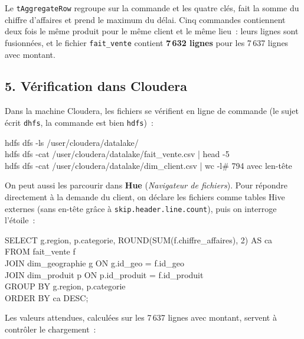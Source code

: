\noindent Le \texttt{tAggregateRow} regroupe sur la commande et les quatre clés, fait la somme du chiffre d'affaires et prend le maximum du délai. Cinq commandes contiennent deux fois le même produit pour le même client et le même lieu~: leurs lignes sont fusionnées, et le fichier \texttt{fait\_vente} contient \textbf{7\,632 lignes} pour les 7\,637 lignes avec montant.

\subsection*{5. Vérification dans Cloudera}
{}

\noindent Dans la machine Cloudera, les fichiers se vérifient en ligne de commande (le sujet écrit \texttt{dhfs}, la commande est bien \texttt{hdfs})~:

\begin{code}
hdfs dfs -ls /user/cloudera/datalake/\\
hdfs dfs -cat /user/cloudera/datalake/fait\_vente.csv | head -5\\
hdfs dfs -cat /user/cloudera/datalake/dim\_client.csv | wc -l\hspace*{3em}\# 794 avec l\textquotesingle{}en-tête
\end{code}

\noindent On peut aussi les parcourir dans \textbf{Hue} (\textit{Navigateur de fichiers}). Pour répondre directement à la demande du client, on déclare les fichiers comme tables Hive externes (sans en-tête grâce à \texttt{skip.header.line.count}), puis on interroge l'étoile~:

\begin{code}[title=\textbf{CA par région et par catégorie}]
SELECT g.region, p.categorie, ROUND(SUM(f.chiffre\_affaires), 2) AS ca\\
FROM fait\_vente f\\
JOIN dim\_geographie g ON g.id\_geo = f.id\_geo\\
JOIN dim\_produit \hspace*{0.6em}p ON p.id\_produit = f.id\_produit\\
GROUP BY g.region, p.categorie\\
ORDER BY ca DESC;
\end{code}

\noindent Les valeurs attendues, calculées sur les 7\,637 lignes avec montant, servent à contrôler le chargement~:

